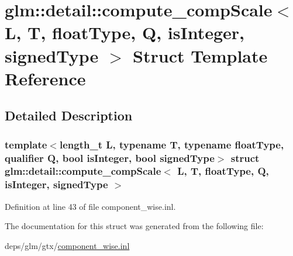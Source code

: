\hypertarget{structglm_1_1detail_1_1compute__compScale}{}\section{glm\+:\+:detail\+:\+:compute\+\_\+comp\+Scale$<$ L, T, float\+Type, Q, is\+Integer, signed\+Type $>$ Struct Template Reference}
\label{structglm_1_1detail_1_1compute__compScale}


\subsection{Detailed Description}
\subsubsection*{template$<$length\+\_\+t L, typename T, typename float\+Type, qualifier Q, bool is\+Integer, bool signed\+Type$>$\newline
struct glm\+::detail\+::compute\+\_\+comp\+Scale$<$ L, T, float\+Type, Q, is\+Integer, signed\+Type $>$}



Definition at line 43 of file component\+\_\+wise.\+inl.



The documentation for this struct was generated from the following file\+:\begin{DoxyCompactItemize}
\item 
deps/glm/gtx/\hyperlink{component__wise_8inl}{component\+\_\+wise.\+inl}\end{DoxyCompactItemize}

